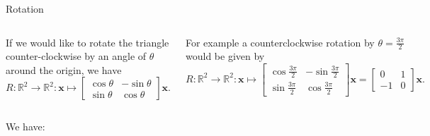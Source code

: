 \documentclass[xcolor=dvipsnames,aspectratio=169,t]{beamer}
\begin{document}
\begin{frame}{Rotation}

\begin{columns}[T]

\column{0.6\tw}

If we would like to rotate the triangle counter-clockwise by an angle of $\theta$ around the origin, we have
\[ R: \mathbb{R}^2 \to \mathbb{R}^2: \mathbf{x} \mapsto \begin{bmatrix} \cos{\theta} & -\sin{\theta} \\ \sin{\theta} & \cos{\theta} \end{bmatrix} \mathbf{x} .\]

For example a counterclockwise rotation by $\theta = \frac{3 \pi}{2}$ would be given by
\[ R: \mathbb{R}^2 \to \mathbb{R}^2: \mathbf{x} \mapsto \begin{bmatrix} \cos{\frac{3 \pi}{2}} & -\sin{\frac{3 \pi}{2}} \\ \sin{\frac{3 \pi}{2}} & \cos{\frac{3 \pi}{2}} \end{bmatrix} \mathbf{x} = \begin{bmatrix} 0 & 1 \\ -1 & 0 \end{bmatrix} \mathbf{x}.\]

\column{0.4\tw}

\includegraphics[width=0.8\tw]{images/fig-triangle-rotate.png}

\end{columns}

We have:


\end{frame}
\end{document}
